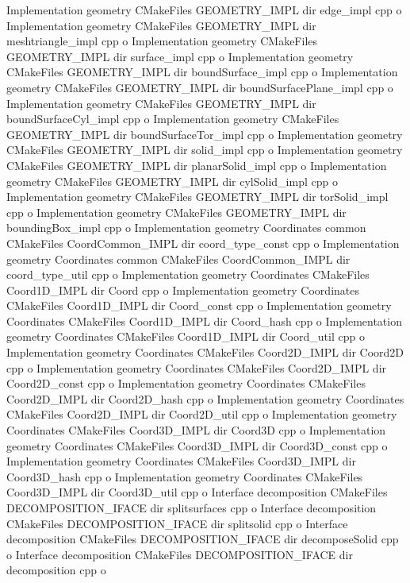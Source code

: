 \begin{DoxyCompactItemize}
Implementation geometry C\+Make\+Files G\+E\+O\+M\+E\+T\+R\+Y\+\_\+\+I\+M\+PL dir edge\+\_\+impl cpp o Implementation geometry C\+Make\+Files G\+E\+O\+M\+E\+T\+R\+Y\+\_\+\+I\+M\+PL dir meshtriangle\+\_\+impl cpp o Implementation geometry C\+Make\+Files G\+E\+O\+M\+E\+T\+R\+Y\+\_\+\+I\+M\+PL dir surface\+\_\+impl cpp o Implementation geometry C\+Make\+Files G\+E\+O\+M\+E\+T\+R\+Y\+\_\+\+I\+M\+PL dir bound\+Surface\+\_\+impl cpp o Implementation geometry C\+Make\+Files G\+E\+O\+M\+E\+T\+R\+Y\+\_\+\+I\+M\+PL dir bound\+Surface\+Plane\+\_\+impl cpp o Implementation geometry C\+Make\+Files G\+E\+O\+M\+E\+T\+R\+Y\+\_\+\+I\+M\+PL dir bound\+Surface\+Cyl\+\_\+impl cpp o Implementation geometry C\+Make\+Files G\+E\+O\+M\+E\+T\+R\+Y\+\_\+\+I\+M\+PL dir bound\+Surface\+Tor\+\_\+impl cpp o Implementation geometry C\+Make\+Files G\+E\+O\+M\+E\+T\+R\+Y\+\_\+\+I\+M\+PL dir solid\+\_\+impl cpp o Implementation geometry C\+Make\+Files G\+E\+O\+M\+E\+T\+R\+Y\+\_\+\+I\+M\+PL dir planar\+Solid\+\_\+impl cpp o Implementation geometry C\+Make\+Files G\+E\+O\+M\+E\+T\+R\+Y\+\_\+\+I\+M\+PL dir cyl\+Solid\+\_\+impl cpp o Implementation geometry C\+Make\+Files G\+E\+O\+M\+E\+T\+R\+Y\+\_\+\+I\+M\+PL dir tor\+Solid\+\_\+impl cpp o Implementation geometry C\+Make\+Files G\+E\+O\+M\+E\+T\+R\+Y\+\_\+\+I\+M\+PL dir bounding\+Box\+\_\+impl cpp o Implementation geometry Coordinates common C\+Make\+Files Coord\+Common\+\_\+\+I\+M\+PL dir coord\+\_\+type\+\_\+const cpp o Implementation geometry Coordinates common C\+Make\+Files Coord\+Common\+\_\+\+I\+M\+PL dir coord\+\_\+type\+\_\+util cpp o Implementation geometry Coordinates C\+Make\+Files Coord1\+D\+\_\+\+I\+M\+PL dir Coord cpp o Implementation geometry Coordinates C\+Make\+Files Coord1\+D\+\_\+\+I\+M\+PL dir Coord\+\_\+const cpp o Implementation geometry Coordinates C\+Make\+Files Coord1\+D\+\_\+\+I\+M\+PL dir Coord\+\_\+hash cpp o Implementation geometry Coordinates C\+Make\+Files Coord1\+D\+\_\+\+I\+M\+PL dir Coord\+\_\+util cpp o Implementation geometry Coordinates C\+Make\+Files Coord2\+D\+\_\+\+I\+M\+PL dir Coord2D cpp o Implementation geometry Coordinates C\+Make\+Files Coord2\+D\+\_\+\+I\+M\+PL dir Coord2\+D\+\_\+const cpp o Implementation geometry Coordinates C\+Make\+Files Coord2\+D\+\_\+\+I\+M\+PL dir Coord2\+D\+\_\+hash cpp o Implementation geometry Coordinates C\+Make\+Files Coord2\+D\+\_\+\+I\+M\+PL dir Coord2\+D\+\_\+util cpp o Implementation geometry Coordinates C\+Make\+Files Coord3\+D\+\_\+\+I\+M\+PL dir Coord3D cpp o Implementation geometry Coordinates C\+Make\+Files Coord3\+D\+\_\+\+I\+M\+PL dir Coord3\+D\+\_\+const cpp o Implementation geometry Coordinates C\+Make\+Files Coord3\+D\+\_\+\+I\+M\+PL dir Coord3\+D\+\_\+hash cpp o Implementation geometry Coordinates C\+Make\+Files Coord3\+D\+\_\+\+I\+M\+PL dir Coord3\+D\+\_\+util cpp o Interface decomposition C\+Make\+Files D\+E\+C\+O\+M\+P\+O\+S\+I\+T\+I\+O\+N\+\_\+\+I\+F\+A\+CE dir splitsurfaces cpp o Interface decomposition C\+Make\+Files D\+E\+C\+O\+M\+P\+O\+S\+I\+T\+I\+O\+N\+\_\+\+I\+F\+A\+CE dir splitsolid cpp o Interface decomposition C\+Make\+Files D\+E\+C\+O\+M\+P\+O\+S\+I\+T\+I\+O\+N\+\_\+\+I\+F\+A\+CE dir decompose\+Solid cpp o Interface decomposition C\+Make\+Files D\+E\+C\+O\+M\+P\+O\+S\+I\+T\+I\+O\+N\+\_\+\+I\+F\+A\+CE dir decomposition cpp o 
\end{DoxyCompactItemize}
